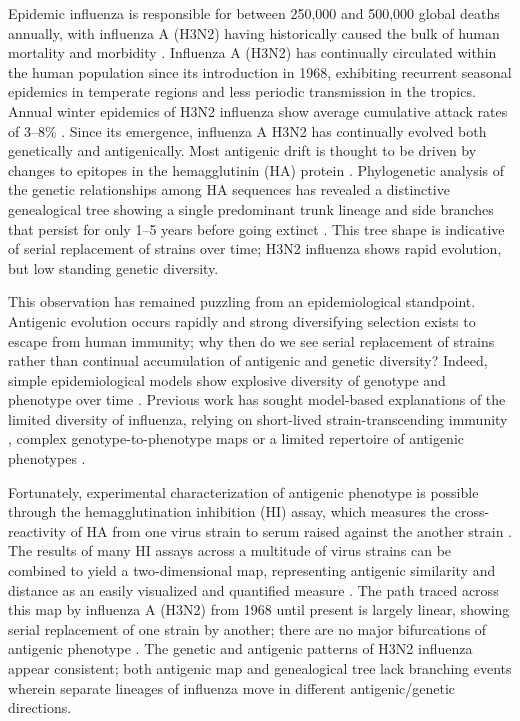 \documentclass[11pt,oneside,letterpaper]{article}
\begin{document}
Epidemic influenza is responsible for between 250,000 and 500,000 global deaths annually, with influenza A (H3N2) having historically caused the bulk of human mortality and morbidity \cite{flufactsheet}.  Influenza A (H3N2) has continually circulated within the human population since its introduction in 1968, exhibiting recurrent seasonal epidemics in temperate regions and less periodic transmission in the tropics.  Annual winter epidemics of H3N2 influenza show average cumulative attack rates of 3--8\% \cite{Monto93,Koelle09}.  Since its emergence, influenza A H3N2 has continually evolved both genetically and antigenically.  Most antigenic drift is thought to be driven by changes to epitopes in the hemagglutinin (HA) protein \cite{Nelson07NatRevGenet}.  Phylogenetic analysis of the genetic relationships among HA sequences has revealed a distinctive genealogical tree showing a single predominant trunk lineage and side branches that persist for only 1--5 years before going extinct \cite{Fitch97}.  This tree shape is indicative of serial replacement of strains over time; H3N2 influenza shows rapid evolution, but low standing genetic diversity.

This observation has remained puzzling from an epidemiological standpoint.  Antigenic evolution occurs rapidly and strong diversifying selection exists to escape from human immunity; why then do we see serial replacement of strains rather than continual accumulation of antigenic and genetic diversity?  Indeed, simple epidemiological models show explosive diversity of genotype and phenotype over time \cite{Ferguson03,Tria05}.  Previous work has sought model-based explanations of the limited diversity of influenza, relying on short-lived strain-transcending immunity \cite{Ferguson03,Tria05}, complex genotype-to-phenotype maps \cite{Koelle06} or a limited repertoire of antigenic phenotypes \cite{Recker07}. 

Fortunately, experimental characterization of antigenic phenotype is possible through the hemagglutination inhibition (HI) assay, which measures the cross-reactivity of HA from one virus strain to serum raised against the another strain \cite{Hirst43}.  The results of many HI assays across a multitude of virus strains can be combined to yield a two-dimensional map, representing antigenic similarity and distance as an easily visualized and quantified measure \cite{Smith04}.  The path traced across this map by influenza A (H3N2) from 1968 until present is largely linear, showing serial replacement of one strain by another; there are no major bifurcations of antigenic phenotype \cite{Smith04}.  The genetic and antigenic patterns of H3N2 influenza appear consistent; both antigenic map and genealogical tree lack branching events wherein separate lineages of influenza move in different antigenic/genetic directions.
\end{document}

